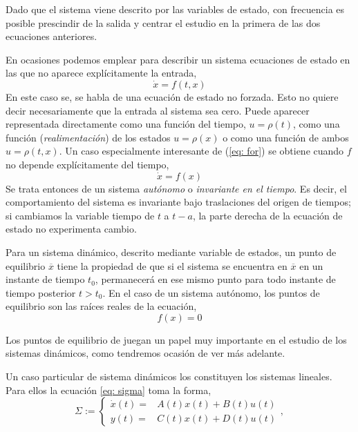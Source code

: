 Dado que el sistema viene descrito por las variables de estado,  con frecuencia es posible prescindir de la salida y centrar el estudio en la primera de las dos ecuaciones anteriores.

 En ocasiones podemos emplear para describir un sistema ecuaciones de estado en las que no aparece explícitamente la entrada,
\begin{equation}
\dot x = f(t,x)
\end{equation}\label{eq: for}
En este caso se, se habla de una ecuación de estado no forzada. Esto no quiere decir necesariamente que la entrada al sistema sea cero. Puede aparecer representada directamente como una función del tiempo, $u=\rho(t)$,  como una función (\emph{realimentación}) de los estados $u = \rho(x)$ o como una función de ambos $u=\rho(t,x)$.
Un caso especialmente interesante de (\ref{eq: for}) se obtiene cuando $f$ no depende explícitamente del tiempo,
\begin{equation}
\dot x = f(x)
\end{equation}
Se trata entonces de un sistema \emph{autónomo} o \emph{invariante en el tiempo}. Es decir, el comportamiento del sistema es invariante bajo traslaciones del origen de tiempos; si cambiamos la variable tiempo de $t$ a $t-a$, la parte derecha de la ecuación de estado no experimenta cambio.

Para un sistema dinámico, descrito mediante variable de estados, un punto de equilibrio $\overline x$  tiene la propiedad de que si el sistema se encuentra en $\overline x$ en un instante de tiempo $t_0$, permanecerá en ese  mismo punto para todo instante de tiempo posterior $t>t_0$. En el caso de un sistema autónomo, los puntos de equilibrio son las raíces reales de la ecuación,
\begin{equation}
f(x)=0
\end{equation} 

Los puntos de equilibrio de juegan un papel muy importante en el estudio de los sistemas dinámicos, como tendremos ocasión de ver más adelante.

Un caso particular de sistema dinámicos los constituyen los sistemas lineales. Para ellos la ecuación \ref{eq: sigma} toma la forma,
\begin{equation}
	\Sigma := \begin{cases}
		\dot x(t) =& A(t)x(t)+B(t)u(t) \\ y(t) =& C(t)x(t)+D(t)u(t)
	\end{cases}, 
\label{eq: sigmaL}
\end{equation}

